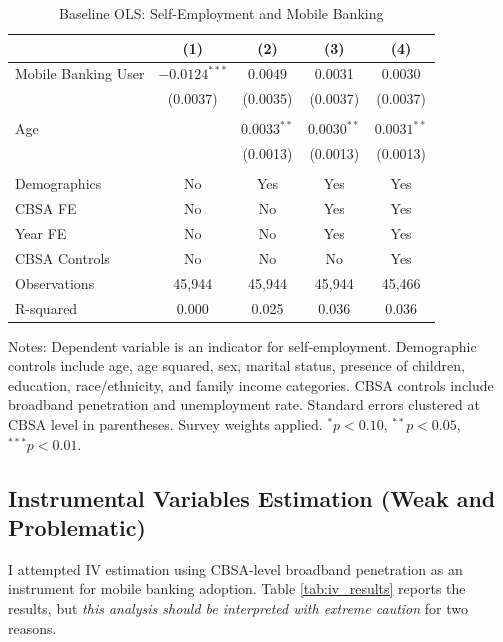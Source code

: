 \documentclass[12pt]{article}
\begin{document}
\begin{table}[H]
\centering
\caption{Baseline OLS: Self-Employment and Mobile Banking}
\label{tab:baseline_ols}
\begin{threeparttable}
\begin{tabular}{lcccc}
\toprule
& (1) & (2) & (3) & (4) \\
\midrule
Mobile Banking User & $-0.0124^{***}$ & 0.0049 & 0.0031 & 0.0030 \\
& (0.0037) & (0.0035) & (0.0037) & (0.0037) \\
\\
Age & & $0.0033^{**}$ & $0.0030^{**}$ & $0.0031^{**}$ \\
& & (0.0013) & (0.0013) & (0.0013) \\
\\
\midrule
Demographics & No & Yes & Yes & Yes \\
CBSA FE & No & No & Yes & Yes \\
Year FE & No & No & Yes & Yes \\
CBSA Controls & No & No & No & Yes \\
\midrule
Observations & 45,944 & 45,944 & 45,944 & 45,466 \\
R-squared & 0.000 & 0.025 & 0.036 & 0.036 \\
\bottomrule
\end{tabular}
\begin{tablenotes}
\small
\item Notes: Dependent variable is an indicator for self-employment. Demographic controls include age, age squared, sex, marital status, presence of children, education, race/ethnicity, and family income categories. CBSA controls include broadband penetration and unemployment rate. Standard errors clustered at CBSA level in parentheses. Survey weights applied. $^{*}p<0.10$, $^{**}p<0.05$, $^{***}p<0.01$.
\end{tablenotes}
\end{threeparttable}
\end{table}

\subsection{Instrumental Variables Estimation (Weak and Problematic)}

I attempted IV estimation using CBSA-level broadband penetration as an instrument for mobile banking adoption. Table \ref{tab:iv_results} reports the results, but \textit{this analysis should be interpreted with extreme caution} for two reasons.
\end{document}
